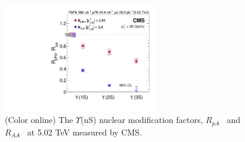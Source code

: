 \begin{figure}
  \begin{center}
  \includegraphics[width=0.60\textwidth]{Figures/ExpOverview/CMS-HIN-18-005_Figure_008.pdf}
  \caption{(Color online) The $\Upsilon$(nS) nuclear modification factors,
    $R_{pA}$~\cite{CMS:2022wfi} and $R_{AA}$~\cite{CMS:2018zza}
    at 5.02 TeV measured by CMS.
  }
  \end{center}
 \label{fig:LHCpBPbPb}
\end{figure}



  
